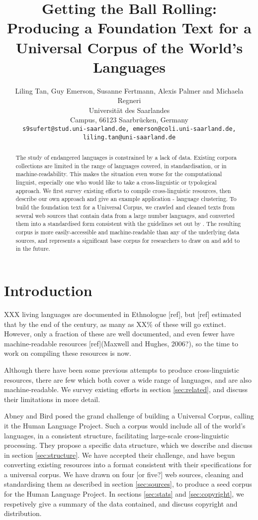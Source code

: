 \documentclass[11pt]{article}
\title{Getting the Ball Rolling: Producing a Foundation Text for a Universal Corpus of the World's Languages}
\author{Liling Tan, Guy Emerson, Susanne Fertmann, Alexis Palmer and Michaela Regneri \\
  Universität des Saarlandes \\
  Campus, 66123 Saarbrücken, Germany \\
  {\tt s9sufert@stud.uni-saarland.de, emerson@coli.uni-saarland.de,} \\
  {\tt liling.tan@uni-saarland.de}}
\date{}
\begin{document}
\maketitle
\begin{abstract}
The study of endangered languages is constrained by a lack of data. Existing corpora collections are limited in the range of languages covered, in standardisation, or in machine-readability. This makes the situation even worse for the computational linguist, especially one who would like to take a cross-linguistic or typological approach. We first survey existing efforts to compile cross-linguistic resources, then describe our own approach and give an example application - language clustering. To build the foundation text for a Universal Corpus, we crawled and cleaned texts from several web sources that contain data from a large number languages, and converted them into a standardised form consistent with the guidelines set out by . The resulting corpus is more easily-accessible and machine-readable than any of the underlying data sources, and represents a significant base corpus for researchers to draw on and add to in the future.
\end{abstract}

\section{Introduction}

XXX living languages are documented in Ethnologue [ref], but [ref] estimated that by the end of the century, as many as XX\% of these will go extinct. However, only a fraction of these are well documented, and even fewer have machine-readable resources [ref](Maxwell and Hughes, 2006?), so the time to work on compiling these resources is now.

Although there have been some previous attempts to produce cross-linguistic resources, there are few which both cover a wide range of languages, and are also machine-readable. We survey existing efforts in section \ref{sec:related}, and discuss their limitations in more detail.

Abney and Bird  posed the grand challenge of building a Universal Corpus, calling it the Human Language Project. Such a corpus would include all of the world's languages, in a consistent structure, facilitating large-scale cross-linguistic processing. They propose a specific data structure, which we describe and discuss in section \ref{sec:structure}. We have accepted their challenge, and have begun converting existing resources into a format consistent with their specifications for a universal corpus. We have drawn on four [or five?] web sources, cleaning and standardising them as described in section \ref{sec:sources}, to produce a seed corpus for the Human Language Project. In sections \ref{sec:stats} and \ref{sec:copyright}, we respetively give a summary of the data contained, and discuss copyright and distribution.
\end{document}
